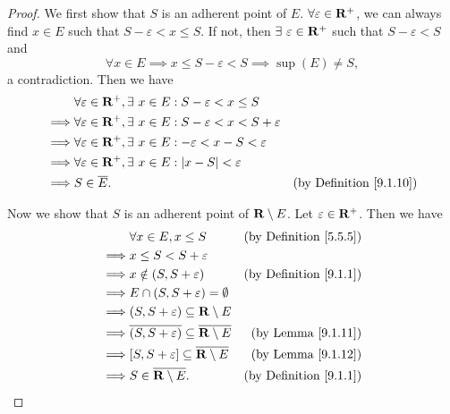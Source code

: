 \begin{proof}
    We first show that \(S\) is an adherent point of \(E\).
    \(\forall \varepsilon \in \mathbf{R}^+\), we can always find \(x \in E\) such that \(S - \varepsilon < x \leq S\).
    If not, then \(\exists\ \varepsilon \in \mathbf{R}^+\) such that \(S - \varepsilon < S\) and
    \[
        \forall x \in E \implies x \leq S - \varepsilon < S \implies \sup(E) \neq S,
    \]
    a contradiction.
    Then we have
    \begin{align*}
                 & \forall \varepsilon \in \mathbf{R}^+, \exists\ x \in E : S - \varepsilon < x \leq S                                                  \\
        \implies & \forall \varepsilon \in \mathbf{R}^+, \exists\ x \in E : S - \varepsilon < x < S + \varepsilon                                       \\
        \implies & \forall \varepsilon \in \mathbf{R}^+, \exists\ x \in E : -\varepsilon < x - S < \varepsilon                                          \\
        \implies & \forall \varepsilon \in \mathbf{R}^+, \exists\ x \in E : \left\lvert x - S\right\rvert < \varepsilon                                                   \\
        \implies & S \in \overline{E}.                                                                    & \text{(by Definition \ref{9.1.10})}
    \end{align*}

    Now we show that \(S\) is an adherent point of \(\mathbf{R} \setminus E\).
    Let \(\varepsilon \in \mathbf{R}^+\).
    Then we have
    \begin{align*}
                 & \forall x \in E, x \leq S                                           & \text{(by Definition \ref{5.5.5})} \\
        \implies & x \leq S < S + \varepsilon                                                                               \\
        \implies & x \notin (S, S + \varepsilon)                                       & \text{(by Definition \ref{9.1.1})} \\
        \implies & E \cap (S, S + \varepsilon) = \emptyset                                                                  \\
        \implies & (S, S + \varepsilon) \subseteq \mathbf{R} \setminus E                                                            \\
        \implies & \overline{(S, S + \varepsilon)} \subseteq \overline{\mathbf{R} \setminus E} & \text{(by Lemma \ref{9.1.11})}     \\
        \implies & [S, S + \varepsilon] \subseteq \overline{\mathbf{R} \setminus E}            & \text{(by Lemma \ref{9.1.12})}     \\
        \implies & S \in \overline{\mathbf{R} \setminus E}.                                    & \text{(by Definition \ref{9.1.1})}
    \end{align*}
\end{proof}